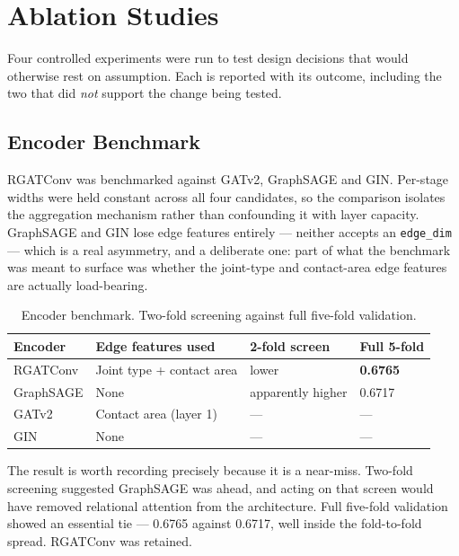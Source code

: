 \documentclass[12pt,oneside,a4paper]{report}
\begin{document}
\section{Ablation Studies}
\label{sec:ablations}

Four controlled experiments were run to test design decisions that would
otherwise rest on assumption. Each is reported with its outcome, including the
two that did \emph{not} support the change being tested.

\subsection{Encoder Benchmark}

RGATConv was benchmarked against GATv2, GraphSAGE and GIN. Per-stage widths
were held constant across all four candidates, so the comparison isolates the
aggregation mechanism rather than confounding it with layer capacity. GraphSAGE
and GIN lose edge features entirely --- neither accepts an \texttt{edge\_dim}
--- which is a real asymmetry, and a deliberate one: part of what the benchmark
was meant to surface was whether the joint-type and contact-area edge features
are actually load-bearing.

\begin{table}[h]
\centering
\caption{Encoder benchmark. Two-fold screening against full five-fold validation.}
\label{tab:encoderbench}
\small
\begin{tabularx}{\textwidth}{@{}L{2.6cm}L{4.4cm}C{2.6cm}C{2.6cm}@{}}
\toprule
\textbf{Encoder} & \textbf{Edge features used} & \textbf{2-fold screen} & \textbf{Full 5-fold} \\
\midrule
RGATConv & Joint type + contact area & lower & \textbf{0.6765} \\
GraphSAGE & None & apparently higher & 0.6717 \\
GATv2 & Contact area (layer 1) & --- & --- \\
GIN & None & --- & --- \\
\bottomrule
\end{tabularx}
\end{table}

The result is worth recording precisely because it is a near-miss. Two-fold
screening suggested GraphSAGE was ahead, and acting on that screen would have
removed relational attention from the architecture. Full five-fold validation
showed an essential tie --- 0.6765 against 0.6717, well inside the fold-to-fold
spread. RGATConv was retained.
\end{document}
